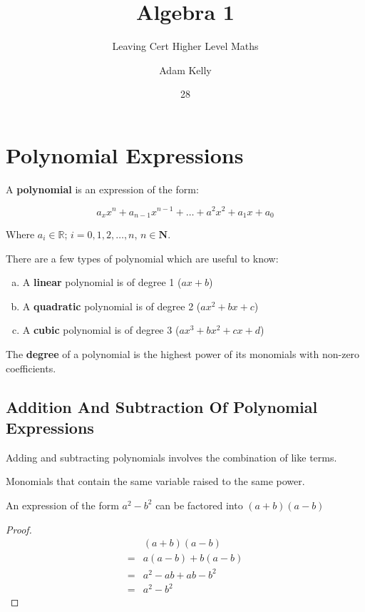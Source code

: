 \documentclass[oneside,english,course]{lecture}
\title{Algebra 1}
\subtitle{Leaving Cert Higher Level Maths}
\author{Adam Kelly}
\date{28}{08}{2018}
\begin{document}
\section{Polynomial Expressions}


\begin{definition}[Polynomial]
	A \textbf{polynomial} is an expression of the form:

	$$
		a_x x^n + a_{n-1} x^{n - 1} + \dots + a^2 x^2 + a_1 x + a_0
	$$

	Where $a_i \in \mathbb{R}$; $i = 0, 1, 2, \dots, n$, $n \in \mathbf{N}$.
\end{definition}

There are a few types of polynomial which are useful to know:

\begin{enumerate}[a)]
	\item A \textbf{linear} polynomial is of degree 1 ($ax + b$)
	\item A \textbf{quadratic} polynomial is of degree 2 ($ax^2 + bx + c$)
	\item A \textbf{cubic} polynomial is of degree 3 ($ax^3 + bx^2 + cx + d$)
\end{enumerate}

\begin{definition}[Degree]
	The \textbf{degree} of a polynomial is the highest power of its monomials with non-zero coefficients.
\end{definition}

\subsection{Addition And Subtraction Of Polynomial Expressions}

Adding and subtracting polynomials involves the combination of like terms.

\begin{definition}
	Monomials that contain the same variable raised to the same power.
\end{definition}

\begin{theorem}
	An expression of the form $a^2 - b^2$ can be factored into $(a + b)(a - b)$
\end{theorem}

\begin{proof}
	\begin{align*}
		  & (a + b)(a - b)      \\
		= & a(a - b) + b(a - b) \\
		= & a^2 - ab + ab -b^2  \\
		= & a^2 - b^2
	\end{align*}
\end{proof}
\end{document}
